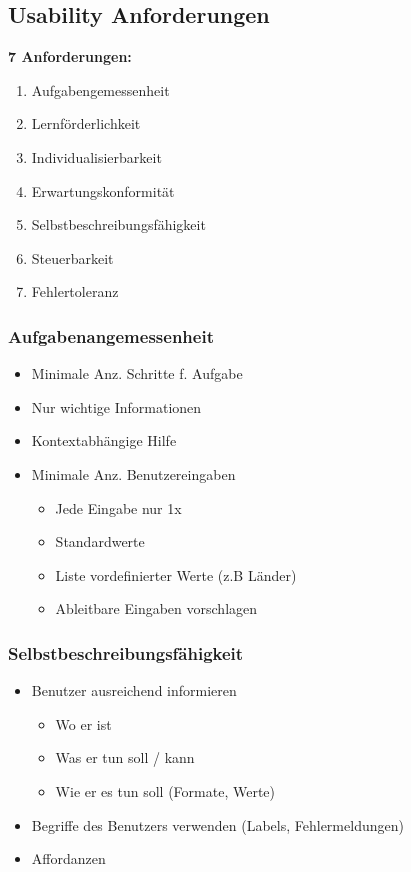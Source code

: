 \documentclass[../ZF_SWEN1.tex]{subfiles}
\begin{document}
\subsection{Usability Anforderungen}

\textbf{7 Anforderungen:}
	\begin{enumerate}
		\item Aufgabengemessenheit
		\item Lernförderlichkeit
		\item Individualisierbarkeit
		\item Erwartungskonformität
		\item Selbstbeschreibungsfähigkeit
		\item Steuerbarkeit
		\item Fehlertoleranz
	\end{enumerate}



\subsubsection{Aufgabenangemessenheit}
\begin{itemize}
	\item Minimale Anz. Schritte f. Aufgabe
	\item Nur wichtige Informationen
	\item Kontextabhängige Hilfe
	\item Minimale Anz. Benutzereingaben
	\begin{itemize}
		\item Jede Eingabe nur 1x
		\item Standardwerte
		\item Liste vordefinierter Werte (z.B Länder)
		\item Ableitbare Eingaben vorschlagen
	\end{itemize}
\end{itemize}

\subsubsection{Selbstbeschreibungsfähigkeit}
\begin{itemize}
	\item Benutzer ausreichend informieren

	\begin{itemize}
		\item Wo er ist
		\item Was er tun soll / kann
		\item Wie er es tun soll (Formate, Werte)
	\end{itemize}
	
	\item Begriffe des Benutzers verwenden (Labels, Fehlermeldungen)
	\item Affordanzen

\end{itemize}
\end{document}
